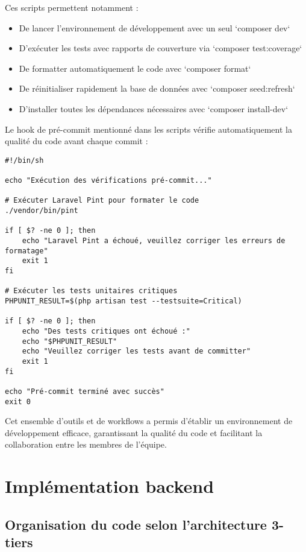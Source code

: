 \documentclass[french,12pt]{report} %
\begin{document}
Ces scripts permettent notamment :

\begin{itemize}
    \item De lancer l'environnement de développement avec un seul `composer dev`
    \item D'exécuter les tests avec rapports de couverture via `composer test:coverage`
    \item De formatter automatiquement le code avec `composer format`
    \item De réinitialiser rapidement la base de données avec `composer seed:refresh`
    \item D'installer toutes les dépendances nécessaires avec `composer install-dev`
\end{itemize}

Le hook de pré-commit mentionné dans les scripts vérifie automatiquement la qualité du code avant chaque commit :

\begin{lstlisting}[style=bashstyle, caption={Hook pre-commit}]
#!/bin/sh

echo "Exécution des vérifications pré-commit..."

# Exécuter Laravel Pint pour formater le code
./vendor/bin/pint

if [ $? -ne 0 ]; then
    echo "Laravel Pint a échoué, veuillez corriger les erreurs de formatage"
    exit 1
fi

# Exécuter les tests unitaires critiques
PHPUNIT_RESULT=$(php artisan test --testsuite=Critical)

if [ $? -ne 0 ]; then
    echo "Des tests critiques ont échoué :"
    echo "$PHPUNIT_RESULT"
    echo "Veuillez corriger les tests avant de committer"
    exit 1
fi

echo "Pré-commit terminé avec succès"
exit 0
\end{lstlisting}

Cet ensemble d'outils et de workflows a permis d'établir un environnement de développement efficace, garantissant la qualité du code et facilitant la collaboration entre les membres de l'équipe.

\section{Implémentation backend}

\subsection{Organisation du code selon l'architecture 3-tiers}
\end{document}
